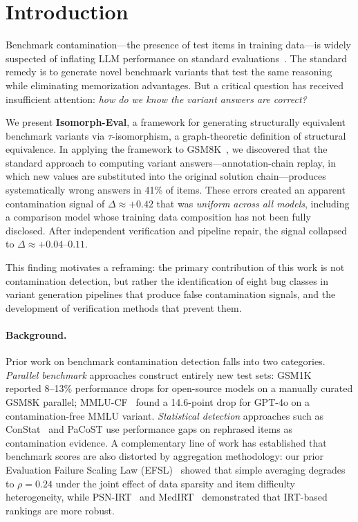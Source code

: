 
\section{Introduction}

Benchmark contamination---the presence of test items in training
data---is widely suspected of inflating LLM performance on standard
evaluations~\cite{zhang2024gsm1k,dekoninck2024constat,mmlucf2024}.
The standard remedy is to generate novel benchmark variants that test
the same reasoning while eliminating memorization advantages. But a
critical question has received insufficient attention: \emph{how do we
know the variant answers are correct?}

We present \textbf{Isomorph-Eval}, a framework for generating
structurally equivalent benchmark variants via $\tau$-isomorphism, a
graph-theoretic definition of structural equivalence. In applying
the framework to GSM8K~\cite{cobbe2021gsm8k}, we discovered that the
standard approach to computing variant answers---annotation-chain
replay, in which new values are substituted into the original
solution chain---produces systematically wrong answers in 41\% of
items. These errors created an apparent contamination signal of
$\Delta \approx +0.42$ that was \emph{uniform across all models},
including a comparison model whose training data composition has not
been fully disclosed.
After independent verification and pipeline repair, the signal
collapsed to $\Delta \approx +0.04$--$0.11$.

This finding motivates a reframing: the primary contribution of this
work is not contamination detection, but rather the identification of
eight bug classes in variant generation pipelines that produce false
contamination signals, and the development of verification methods
that prevent them.

\paragraph{Background.}
Prior work on benchmark contamination detection falls into two
categories. \emph{Parallel benchmark} approaches construct entirely
new test sets: GSM1K~\cite{zhang2024gsm1k} reported 8--13\% performance
drops for open-source models on a manually curated GSM8K parallel;
MMLU-CF~\cite{mmlucf2024} found a 14.6-point drop for GPT-4o on a
contamination-free MMLU variant. \emph{Statistical detection} approaches
such as ConStat~\cite{dekoninck2024constat} and
PaCoST use performance gaps on rephrased items as contamination evidence.
A complementary line of work has established that benchmark scores
are also distorted by aggregation methodology: our prior Evaluation
Failure Scaling Law (EFSL)~\cite{kang2026efsl} showed that simple
averaging degrades to $\rho = 0.24$ under the joint effect of data
sparsity and item difficulty heterogeneity, while
PSN-IRT~\cite{zhou2026psnirt} and MedIRT~\cite{luo2025medirt}
demonstrated that IRT-based rankings are more robust.

